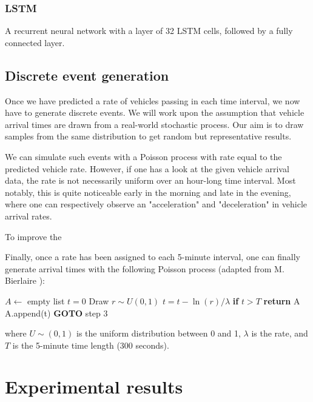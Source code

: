 \documentclass[10pt,conference,compsocconf]{IEEEtran}
\begin{document}
\subsubsection{LSTM}

A recurrent neural network with a layer of 32 LSTM cells, followed by a fully connected layer.

\subsection{Discrete event generation}

Once we have predicted a rate of vehicles passing in each time interval, we now have to generate discrete events. We will work upon the assumption that vehicle arrival times are drawn from a real-world stochastic process. Our aim is to draw samples from the same distribution to get random but representative results.

We can simulate such events with a Poisson process \cite{poisson} with rate equal to the predicted vehicle rate. However, if one has a look at the given vehicle arrival data, the rate is not necessarily uniform over an hour-long time interval. Most notably, this is quite noticeable early in the morning and late in the evening, where one can respectively observe an "acceleration" and "deceleration" in vehicle arrival rates.

To improve the

Finally, once a rate has been assigned to each 5-minute interval, one can finally generate arrival times with the following Poisson process (adapted from M. Bierlaire \cite{poisson}):
\begin{algorithmic}[1]
    \State $A \gets $ empty list
    \State $t = 0$
    \State Draw $r \sim U(0,1)$
    \State $t = t - \ln(r) / \lambda$
    \State \textbf{if} $t > T$ \textbf{return} A
    \State A.append(t)
    \State \textbf{GOTO} step 3
\end{algorithmic}

where $U\sim(0,1)$ is the uniform distribution between 0 and 1, $\lambda$ is the rate, and $T$ is the 5-minute time length ($300$ seconds).



\section{Experimental results}
\end{document}
